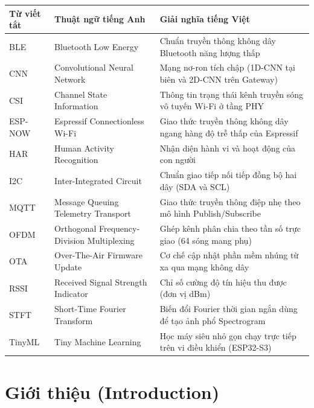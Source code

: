 \documentclass{hcmut-report}
\begin{document}
\begin{table}[H]
\centering
\small
\begin{tabularx}{\textwidth}{|P{2.2cm}|P{5.5cm}|Y|}
\hline
\textbf{Từ viết tắt} & \textbf{Thuật ngữ tiếng Anh} & \textbf{Giải nghĩa tiếng Việt} \\
\hline
BLE & Bluetooth Low Energy & Chuẩn truyền thông không dây Bluetooth năng lượng thấp \\
\hline
CNN & Convolutional Neural Network & Mạng nơ-ron tích chập (1D-CNN tại biên và 2D-CNN trên Gateway) \\
\hline
CSI & Channel State Information & Thông tin trạng thái kênh truyền sóng vô tuyến Wi-Fi ở tầng PHY \\
\hline
ESP-NOW & Espressif Connectionless Wi-Fi & Giao thức truyền thông không dây ngang hàng độ trễ thấp của Espressif \\
\hline
HAR & Human Activity Recognition & Nhận diện hành vi và hoạt động của con người \\
\hline
I2C & Inter-Integrated Circuit & Chuẩn giao tiếp nối tiếp đồng bộ hai dây (SDA và SCL) \\
\hline
MQTT & Message Queuing Telemetry Transport & Giao thức truyền thông điệp nhẹ theo mô hình Publish/Subscribe \\
\hline
OFDM & Orthogonal Frequency-Division Multiplexing & Ghép kênh phân chia theo tần số trực giao (64 sóng mang phụ) \\
\hline
OTA & Over-The-Air Firmware Update & Cơ chế cập nhật phần mềm nhúng từ xa qua mạng không dây \\
\hline
RSSI & Received Signal Strength Indicator & Chỉ số cường độ tín hiệu thu được (đơn vị dBm) \\
\hline
STFT & Short-Time Fourier Transform & Biến đổi Fourier thời gian ngắn dùng để tạo ảnh phổ Spectrogram \\
\hline
TinyML & Tiny Machine Learning & Học máy siêu nhỏ gọn chạy trực tiếp trên vi điều khiển (ESP32-S3) \\
\hline
\end{tabularx}
\end{table}

\newpage
\tableofcontents
\newpage

\section[Giới thiệu]{Giới thiệu (Introduction)}
\end{document}
